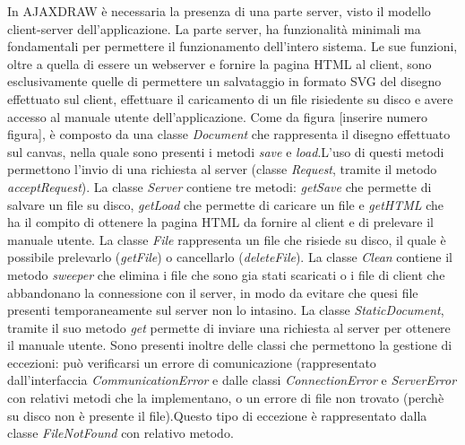 In AJAXDRAW è necessaria la presenza di una parte server, visto il modello client-server dell'applicazione. La parte server, ha funzionalità minimali ma fondamentali per permettere il funzionamento dell'intero sistema. Le sue funzioni, oltre a quella di essere un webserver e fornire la pagina HTML al client, sono esclusivamente quelle di permettere un salvataggio in formato SVG del disegno effettuato sul client, effettuare il caricamento di un file risiedente su disco e avere accesso al manuale utente dell'applicazione. Come da figura [inserire numero figura], è composto da una classe \textit{Document} che rappresenta il disegno effettuato sul canvas, nella quale sono presenti i metodi \textit{save} e \textit{load}.L'uso di questi metodi permettono l'invio di una richiesta al server (classe \textit{Request}, tramite il metodo \textit{acceptRequest}). La classe \textit{Server} contiene tre metodi: \textit{getSave} che permette di salvare un file su disco, \textit{getLoad} che permette di caricare un file e \textit{getHTML} che ha il compito di ottenere la pagina HTML da fornire al client e di prelevare il manuale utente. La classe \textit{File} rappresenta un file che risiede su disco, il quale è possibile prelevarlo (\textit{getFile}) o cancellarlo (\textit{deleteFile}). La classe \textit{Clean} contiene il metodo \textit{sweeper} che elimina i file che sono gia stati scaricati o i file di client che abbandonano la connessione con il server, in modo da evitare che quesi file presenti temporaneamente sul server non lo intasino. La classe \textit{StaticDocument}, tramite il suo metodo \textit{get} permette di inviare una richiesta al server per ottenere il manuale utente. Sono presenti inoltre delle classi che permettono la gestione di eccezioni: può verificarsi un errore di comunicazione (rappresentato dall'interfaccia \textit{CommunicationError} e dalle classi \textit{ConnectionError} e \textit{ServerError} con relativi metodi che la implementano, o un errore di file non trovato (perchè su disco non è presente il file).Questo tipo di eccezione è rappresentato dalla classe \textit{FileNotFound} con relativo metodo. 



